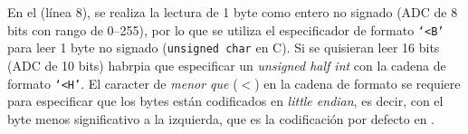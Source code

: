 En el  (línea 8), se realiza la lectura de 1 byte como entero no signado (ADC de 8 bits con rango de 0--255), por lo que se utiliza el especificador de formato \texttt{`<B'} para leer 1 byte no signado (\texttt{unsigned char} en C).
Si se quisieran leer 16 bits (ADC de 10 bits) habrpia que especificar un \emph{unsigned half int} con la cadena de formato \texttt{`<H'}. El caracter de \emph{menor que} ($<$) en la cadena de formato se requiere para especificar que los bytes están codificados en \emph{little endian}, es decir, con el byte menos significativo a la izquierda, que es la codificación por defecto en \IIC{}.

